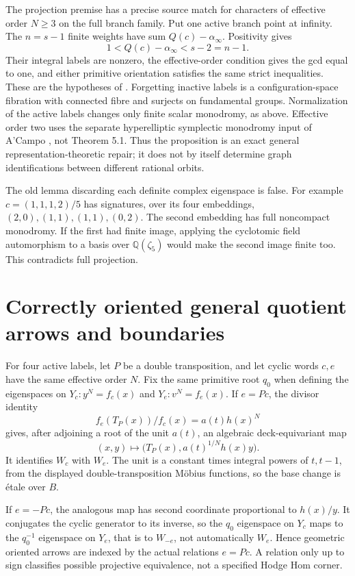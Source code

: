 \documentclass[11pt]{article}
\theoremstyle{remark}
\newcommand{\Q}{\mathbb Q}
\begin{document}
The projection premise has a precise source match for characters of
effective order \(N\geq3\) on the full branch family.  Put one active
branch point at infinity.  The \(n=s-1\) finite weights have sum
\(Q(c)-\alpha_\infty\).  Positivity gives
\[
 1<Q(c)-\alpha_\infty<s-2=n-1.
\]
Their integral labels are nonzero, the effective-order condition gives
the gcd equal to one, and either primitive orientation satisfies the
same strict inequalities.  These are the hypotheses of
\cite[Definition 1.1(a), Theorem 5.1]{MN}.
Forgetting inactive labels is a configuration-space fibration with
connected fibre and surjects on fundamental groups.  Normalization
of the active labels changes only finite scalar monodromy, as above.
Effective order two uses the separate hyperelliptic symplectic
monodromy input of A'Campo \cite{ACampo}, not Theorem 5.1.
Thus the proposition is an exact general representation-theoretic
repair; it does not by itself determine graph identifications between
different rational orbits.

The old lemma discarding each definite complex eigenspace is false.
For example \(c=(1,1,1,2)/5\) has signatures, over its four embeddings,
\((2,0),(1,1),(1,1),(0,2)\).  The second embedding has full noncompact
monodromy.  If the first had finite image, applying the cyclotomic
field automorphism to a basis over \(\Q(\zeta_5)\) would make the
second image finite too.  This contradicts full projection.

\section{Correctly oriented general quotient arrows and boundaries}
For four active labels, let \(P\) be a double transposition, and let
cyclic words \(c,e\) have the same effective order \(N\).
Fix the same primitive root \(q_0\) when defining the eigenspaces
on \(Y_c:y^N=f_c(x)\) and \(Y_e:v^N=f_e(x)\).
If \(e=Pc\), the divisor identity
\[
 f_e(T_P(x))/f_c(x)=a(t)h(x)^N
\]
gives, after adjoining a root of the unit \(a(t)\), an algebraic
deck-equivariant map
\[
 (x,y)\longmapsto\bigl(T_P(x),a(t)^{1/N}h(x)y\bigr).
\]
It identifies \(W_c\) with \(W_e\).  The unit is a constant times
integral powers of \(t,t-1\), from the displayed double-transposition
M\"obius functions, so the base change is \'etale over \(B\).

If \(e=-Pc\), the analogous map has second coordinate proportional
to \(h(x)/y\).  It conjugates the cyclic generator to its inverse,
so the \(q_0\) eigenspace on \(Y_c\) maps to the \(q_0^{-1}\)
eigenspace on \(Y_e\), that is to \(W_{-e}\), not automatically
\(W_e\).  Hence geometric oriented arrows are indexed by the
actual relations \(e=Pc\).  A relation only up to sign classifies
possible projective equivalence, not a specified Hodge Hom corner.
\end{document}

